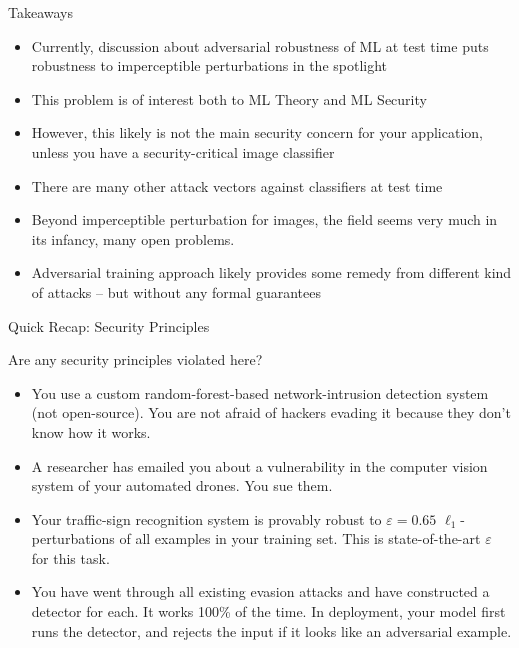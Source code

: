 \documentclass[10pt]{beamer}
\begin{document}
\begin{frame}{Takeaways}
  \begin{itemize}[<+-| @alert+>]
    \item Currently, discussion about adversarial robustness of ML at test time puts robustness to
      imperceptible perturbations in the spotlight
    \item This problem is of interest both to ML Theory and ML Security
    \item However, this likely is not the main security concern for your application, unless you
        have a security-critical image classifier
    \item There are many other attack vectors against classifiers at test time
    \item Beyond imperceptible perturbation for images, the field seems very much in its infancy,
      many open problems.
    \item Adversarial training approach likely provides some remedy from different kind of attacks --
      but without any formal guarantees
  \end{itemize}
\end{frame}


\begin{frame}{Quick Recap: Security Principles}

  \alert{Are any security principles violated here?}
  \begin{itemize}[<+-| @alert+>]
    \item You use a custom random-forest-based network-intrusion detection system (not open-source).
        You are not afraid of hackers evading it because they don't know how it works.
    \item A researcher has emailed you about a vulnerability in the computer vision system of your
        automated drones. You sue them.
    \item Your traffic-sign recognition system is provably robust to $\varepsilon=0.65$
        $\ell_1$-perturbations of all examples in your training set. This is state-of-the-art
        $\varepsilon$ for this task.
    \item You have went through all existing evasion attacks and have constructed a detector for each.
      It works 100\% of the time. In deployment, your model first runs the detector, and rejects
      the input if it looks like an adversarial example.
  \end{itemize}

\end{frame}
\end{document}
